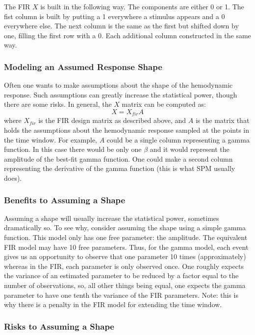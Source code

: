 \documentclass{article}
\begin{document}
\noindent
The FIR $X$ is built in the following way. The components are either 0
or 1. The fist column is built by putting a 1 everywhere a stimulus
appears and a 0 everywhere else. The next column is the same as the
first but shifted down by one, filling the first row with a 0. Each
additional column constructed in the same way.

\subsubsection{Modeling an Assumed Response Shape}

\noindent
Often one wants to make assumptions about the shape of the hemodynamic
response. Such assumptions can greatly increase the statistical power,
though there are some risks. In general, the $X$ matrix can be
computed as:
\begin{equation}
X = X_{fir} A
\end{equation}
where $X_{fir}$ is the FIR design matrix as described above, and $A$
is the matrix that holds the assumptions about the hemodynamic
response sampled at the points in the time window. For example, $A$
could be a single column representing a gamma function. In this case
there would be only one $\beta$ and it would represent the amplitude
of the best-fit gamma function. One could make a second column
representing the derivative of the gamma function (this is what SPM
usually does).

\subsubsection{Benefits to Assuming a Shape}

\noindent
Assuming a shape will usually increase the statistical power,
sometimes dramatically so. To see why, consider assuming the shape
using a simple gamma function. This model only has one free parameter:
the amplitude. The equivalent FIR model may have 10 free
parameters. Thus, for the gamma model, each event gives us an
opportunity to observe that one parameter 10 times (approximately)
whereas in the FIR, each parameter is only observed once. One
roughly expects the variance of an estimated parameter to be reduced
by a factor equal to the number of observations, so, all other things
being equal, one expects the gamma parameter to have one tenth the
variance of the FIR parameters. Note: this is why there is a penalty
in the FIR model for extending the time window.

\subsubsection{Risks to Assuming a Shape}
\end{document}
